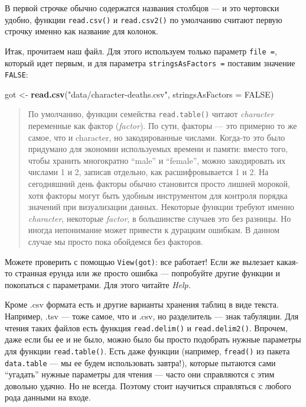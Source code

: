 \documentclass[]{book}
\newenvironment{Shaded}{\begin{snugshade}}{\end{snugshade}}
\newcommand{\KeywordTok}[1]{\textcolor[rgb]{0.13,0.29,0.53}{\textbf{#1}}}
\newcommand{\DataTypeTok}[1]{\textcolor[rgb]{0.13,0.29,0.53}{#1}}
\newcommand{\StringTok}[1]{\textcolor[rgb]{0.31,0.60,0.02}{#1}}
\newcommand{\OtherTok}[1]{\textcolor[rgb]{0.56,0.35,0.01}{#1}}
\newcommand{\NormalTok}[1]{#1}
\begin{document}
В первой строчке обычно содержатся названия столбцов --- и это чертовски
удобно, функции \texttt{read.csv()} и \texttt{read.csv2()} по умолчанию
считают первую строчку именно как название для колонок.

Итак, прочитаем наш файл. Для этого используем только параметр
\texttt{file\ =}, который идет первым, и для параметра
\texttt{stringsAsFactors\ =} поставим значение \texttt{FALSE}:

\begin{Shaded}
\begin{Highlighting}[]
\NormalTok{got <-}\StringTok{ }\KeywordTok{read.csv}\NormalTok{(}\StringTok{"data/character-deaths.csv"}\NormalTok{, }\DataTypeTok{stringsAsFactors =} \OtherTok{FALSE}\NormalTok{)}
\end{Highlighting}
\end{Shaded}

\begin{quote}
По умолчанию, функции семейства \texttt{read.table()} читают
\emph{character} переменные как фактор (\emph{factor}). По сути, факторы
--- это примерно то же самое, что и character, но закодированные
числами. Когда-то это было придумано для экономии используемых времени и
памяти: вместо того, чтобы хранить многократно ``male'' и ``female'',
можно закодировать их числами 1 и 2, записав отдельно, как
расшифровывается 1 и 2. На сегодняшний день факторы обычно становится
просто лишней морокой, хотя факторы могут быть удобным инструментом для
контроля порядка значений при визуализации данных. Некоторые функции
требуют именно \emph{character}, некоторые \emph{factor}, в большинстве
случаев это без разницы. Но иногда непонимание может привести к дурацким
ошибкам. В данном случае мы просто пока обойдемся без факторов.
\end{quote}

Можете проверить с помощью \texttt{View(got)}: все работает! Если же
вылезает какая-то странная ерунда или же просто ошибка --- попробуйте
другие функции и покопаться с параметрами. Для этого читайте
\emph{Help.}

Кроме .csv формата есть и другие варианты хранения таблиц в виде текста.
Например, .tsv --- тоже самое, что и .csv, но разделитель --- знак
табуляции. Для чтения таких файлов есть функция \texttt{read.delim()} и
\texttt{read.delim2()}. Впрочем, даже если бы ее и не было, можно было
бы просто подобрать нужные параметры для функции \texttt{read.table()}.
Есть даже функции (например, \texttt{fread()} из пакета
\texttt{data.table} --- мы ее будем использовать завтра!), которые
пытаются сами ``угадать'' нужные параметры для чтения --- часто они
справляются с этим довольно удачно. Но не всегда. Поэтому стоит
научиться справляться с любого рода данными на входе.
\end{document}
